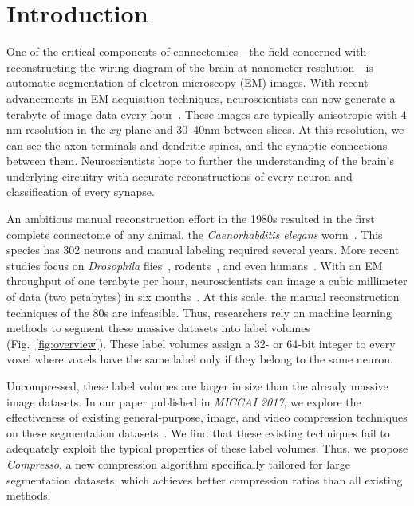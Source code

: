 \section{Introduction}

One of the critical components of connectomics---the field concerned with reconstructing the wiring diagram of the brain at nanometer resolution---is automatic segmentation of electron microscopy (EM) images.
With recent advancements in EM acquisition techniques, neuroscientists can now generate a terabyte of image data every hour~\cite{richard2016imaging}.
These images are typically anisotropic with $4$nm resolution in the $xy$ plane and \numrange{30}{40}nm between slices. 
At this resolution, we can see the axon terminals and dendritic spines, and the synaptic connections between them.
Neuroscientists hope to further the understanding of the brain's underlying circuitry with accurate reconstructions of every neuron and classification of every synapse.


An ambitious manual reconstruction effort in the 1980s resulted in the first complete connectome of any animal, the \textit{Caenorhabditis elegans} worm~\cite{white1986structure}. 
This species has 302 neurons and manual labeling required several years.
More recent studies focus on \textit{Drosophila} flies~\cite{jovanic2016competitive,takemura2015synaptic},  rodents~\cite{richard2016imaging}, and even humans~\cite{sporns2005human}. 
With an EM throughput of one terabyte per hour, neuroscientists can image a cubic millimeter of data (two petabytes) in six months~\cite{suissa2016automatic}. 
At this scale, the manual reconstruction techniques of the 80s are infeasible.
Thus, researchers rely on machine learning methods to segment these massive datasets into label volumes (Fig.~\ref{fig:overview}).
These label volumes assign a 32- or 64-bit integer to every voxel where voxels have the same label only if they belong to the same neuron.

Uncompressed, these label volumes are larger in size than the already massive image datasets.
In our paper published in \textit{MICCAI 2017}, we explore the effectiveness of existing general-purpose, image, and video compression techniques on these segmentation datasets~\cite{matejek2017compresso}.
We find that these existing techniques fail to adequately exploit the typical properties of these label volumes.
Thus, we propose \textit{Compresso}, a new compression algorithm specifically tailored for large segmentation datasets, which achieves better compression ratios than all existing methods.


